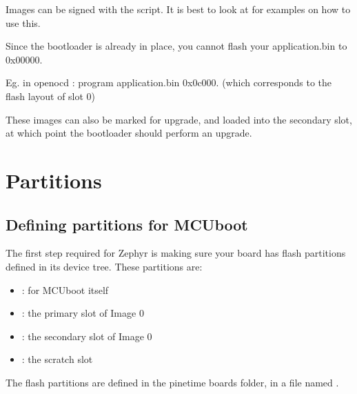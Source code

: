 \documentclass[letterpaper,10pt,english]{sphinxmanual}
\begin{document}
Images can be signed with the  script.  It is best
to look at  for examples on how to use this.

Since the bootloader is already in place, you cannot flash your application.bin to 0x00000.

Eg. in openocd : program application.bin 0x0c000. (which corresponds to the flash layout of slot 0)

These images can also be marked for upgrade, and loaded into the secondary slot,
at which point the bootloader should perform an upgrade.


\section{Partitions}
\label{\detokenize{fota/partitions:partitions}}\label{\detokenize{fota/partitions:signing}}\label{\detokenize{fota/partitions::doc}}
\begin{sphinxVerbatim}[commandchars=\\\{\}]
\end{sphinxVerbatim}


\subsection{Defining partitions for MCUboot}
\label{\detokenize{fota/partitions:defining-partitions-for-mcuboot}}
The first step required for Zephyr is making sure your board has flash
partitions defined in its device tree. These partitions are:
\begin{itemize}
\item {} 
: for MCUboot itself

\item {} 
: the primary slot of Image 0

\item {} 
: the secondary slot of Image 0

\item {} 
: the scratch slot

\end{itemize}

The flash partitions are defined in the pinetime boards folder, in a
file named .
\end{document}

